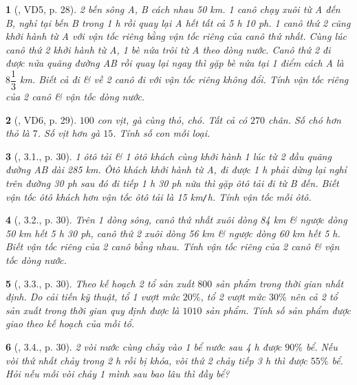 \documentclass{article}
\newtheorem{baitoan}{}
\begin{document}
\begin{baitoan}[\cite{Binh_boi_duong_Toan_9_tap_2}, VD5, p. 28]
	2 bến sông A, B cách nhau {\rm50 km}. 1 canô chạy xuôi từ A đến B, nghỉ tại bến B trong {\rm1 h} rồi quay lại A hết tất cả {\rm5 h 10 ph}. 1 canô thứ 2 cũng khởi hành từ A với vận tốc riêng bằng vận tốc riêng của canô thứ nhất. Cùng lúc canô thứ 2 khởi hành từ A, 1 bè nứa trôi từ A theo dòng nước. Canô thứ 2 đi được nửa quãng đường AB rồi quay lại ngay thì gặp bè nứa tại 1 điểm cách A là $8\dfrac{1}{3}$ {\rm km}. Biết cả đi \& về 2 canô đi với vận tốc riêng không đổi. Tính vận tốc riêng của 2 canô \& vận tốc dòng nước.
\end{baitoan}

\begin{baitoan}[\cite{Binh_boi_duong_Toan_9_tap_2}, VD6, p. 29]
	$100$ con vịt, gà cùng thỏ, chó. Tất cả có $270$ chân. Số chó hơn thỏ là $7$. Số vịt hơn gà $15$. Tính số con mỗi loại.
\end{baitoan}

\begin{baitoan}[\cite{Binh_boi_duong_Toan_9_tap_2}, 3.1., p. 30]
	1 ôtô tải \& 1 ôtô khách cùng khởi hành 1 lúc từ 2 đầu quãng đường AB dài {\rm285 km}. Ôtô khách khởi hành từ A, đi được {\rm1 h} phải dừng lại nghỉ trên đường {\rm30 ph} sau đó đi tiếp {\rm1 h 30 ph} nữa thì gặp ôtô tải đi từ B đến. Biết vận tốc ôtô khách hơn vận tốc ôtô tải là {\rm15 km{\tt/}h}. Tính vận tốc mỗi ôtô.
\end{baitoan}

\begin{baitoan}[\cite{Binh_boi_duong_Toan_9_tap_2}, 3.2., p. 30]
	Trên 1 dòng sông, canô thứ nhất xuôi dòng {\rm84 km} \& ngược dòng {\rm50 km} hết {\rm5 h 30 ph}, canô thứ 2 xuôi dòng {\rm56 km} \& ngược dòng {\rm60 km} hết {\rm5 h}. Biết vận tốc riêng của 2 canô bằng nhau. Tính vận tốc riêng của 2 canô \& vận tốc dòng nước.
\end{baitoan}

\begin{baitoan}[\cite{Binh_boi_duong_Toan_9_tap_2}, 3.3., p. 30]
	Theo kế hoạch 2 tổ sản xuất $800$ sản phẩm trong thời gian nhất định. Do cải tiến kỹ thuật, tổ 1 vượt mức $20\%$, tổ 2 vượt mức $30\%$ nên cả 2 tổ sản xuất trong thời gian quy định được là $1010$ sản phẩm. Tính số sản phẩm được giao theo kế hoạch của mỗi tổ.
\end{baitoan}

\begin{baitoan}[\cite{Binh_boi_duong_Toan_9_tap_2}, 3.4., p. 30]
	2 vòi nước cùng chảy vào 1 bể nước sau {\rm4 h} được $90\%$ bể. Nếu vòi thứ nhất chảy trong {\rm2 h} rồi bị khóa, vòi thứ 2 chảy tiếp {\rm3 h} thì được $55\%$ bể. Hỏi nếu mỗi vòi chảy 1 mình sau bao lâu thì đầy bể?
\end{baitoan}
\end{document}
